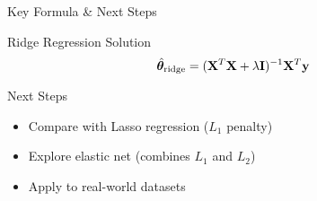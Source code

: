 \documentclass{beamer}
\begin{document}
\begin{frame}{Key Formula \& Next Steps}
\begin{theorembox}{Ridge Regression Solution}
$$\hat{\boldsymbol{\theta}}_{\text{ridge}} = (\mathbf{X}^T\mathbf{X} + \lambda\mathbf{I})^{-1}\mathbf{X}^T\mathbf{y}$$
\end{theorembox}
\pause

\begin{alertbox}{Next Steps}
\begin{itemize}
\item Compare with Lasso regression ($L_1$ penalty)
\item Explore elastic net (combines $L_1$ and $L_2$)
\item Apply to real-world datasets
\end{itemize}
\end{alertbox}
\end{frame}
\end{document}
